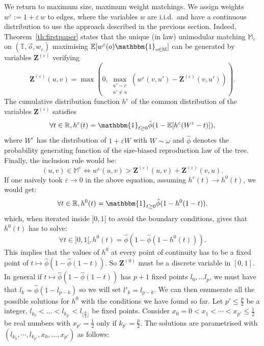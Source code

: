 \documentclass[11pt]{article}
\newcommand{\eps}{\varepsilon}
\begin{document}
We return to maximum size, maximum weight matchings. We assign weights $w^\varepsilon := 1 + \varepsilon \, w$ to edges, where the variables $w$ are i.i.d.~and have a continuous distribution to use the approach described in the previous section. Indeed, Theorem~\ref{th:firstpaper} states that the unique (in law) unimodular matching $\mathbb{M}_\eps$ on $(\mathbb{T},\overset{\rightarrow}{o},w_\eps)$ maximising $\mathbb{E}[w^\varepsilon(o)\mathbbm{1}_{o \in \mathbb{M}}]$ can be generated by variables $\mathbf{Z}^{(\eps)}$ verifying
\begin{equation}\label{eq:Zepsilonrecursion}
    \mathbf{Z}^{(\eps)}(u,v)= \max\left(0,\max_{\substack{ u' \sim v \\ u' \neq u}}\left( w^\eps(v,u')-\mathbf{Z}^{(\eps)}(v,u') \right) \right).
\end{equation}
The cumulative distribution function $h^{\eps}$ of the common distribution of the variables $\mathbf Z^{(\varepsilon)}$ satisfies
\begin{equation}\label{eq:hequation}
    \forall t \in \mathbb{R}, h^{\eps}(t)=\mathbbm{1}_{t \geq 0} \hat{\phi}(1-\mathbb{E}[h^{\eps} (W^\eps-t)]),
\end{equation}
where $W^\eps$ has the distribution of $1+\eps W$ with $W \sim \omega$ and $\hat \phi$ denotes the probability generating function of the size-biased reproduction law of the tree.
Finally, the inclusion rule would be:
\begin{equation}\label{eq:Zepsiloninclusionrule}
    (u,v) \in \mathbb{M}^\eps \Leftrightarrow w^\eps (u,v) > \mathbf{Z}^{(\eps)}(u,v)+\mathbf{Z}^{(\eps)}(v,u).
\end{equation}
If one naively took $\eps \rightarrow 0$ in the above equation, assuming $h^{\eps}(t) \rightarrow h^0(t)$, we would get:
\begin{equation}\label{eq:equationnaive}
    \forall t \in \mathbb{R} , h^0(t) = \mathbbm{1}_{t \geq 0 }\hat{\phi}(1-h^0(1-t)).
\end{equation}
which, when iterated inside $]0,1[$ to avoid the boundary conditions, gives that $h^0(t)$ has to solve:
\begin{equation}\label{eq:fixedpointpoisson}
    \forall t \in ]0,1[ , h^0(t)=\hat{\phi}(1-\hat{\phi}(1-h^0(t))).
\end{equation}
This implies that the values of $h^0$ at every point of continuity has to be a fixed point of $t \mapsto \hat{\phi}(1-\hat{\phi}(1-t))$. So $\mathbf{Z}^{(0)}$ must be a discrete variable in $[0,1]$.
In general if $t \mapsto \hat{\phi}(1-\hat{\phi}(1-t))$ has $p+1$ fixed points $l_0,...l_p$, we must have that $l_k=\hat{\phi}(1-l_{p-k})$ so we will set $l'_k=l_{p-k}$. We can then enumerate all the possible solutions for $h^0$ with the conditions we have found so far. Let $p'\leq \tfrac{p}{2}$ be a integer, $l_{k_0}<...<l_{k_{p'}}<l_{\lfloor \frac{p}{2} \rfloor}$ be fixed points. Consider $x_0=0<x_1<\cdots<x_{p'}\leq \frac{1}{2}$ be real numbers with $x_{p'}=\frac{1}{2}$ only if ${k_{p'}}=\frac{p}{2}$. The solutions are parametrised with $(l_{k_0},\cdots,l_{k_{p'}},x_0,...,x_{p'})$ as follows:
\end{document}
